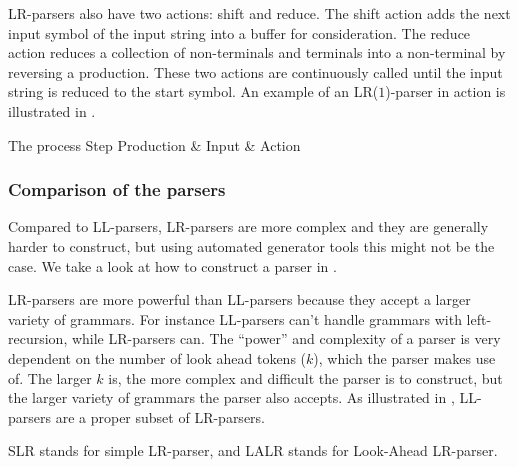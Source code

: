 LR-parsers also have two actions: shift and reduce. The shift action adds the
next input symbol of the input string into a buffer for consideration. The
reduce action reduces a collection of non-terminals and terminals into a
non-terminal by reversing a production. These two actions are continuously
called until the input string is reduced to the start symbol\cite{sebesta2013}.
An example of an LR($1$)-parser in action is illustrated in .

	  {The process	    					 }
{Step  	 }{Production & Input       & Action                     }{
}

\subsubsection{Comparison of the parsers}
Compared to LL-parsers, LR-parsers are more complex and they are generally
harder to construct\cite[p. 193]{sebesta2013}, but using automated generator
tools this might not be the case. We take a look at how to construct a parser in
.

LR-parsers are more powerful than LL-parsers because they accept a larger
variety of grammars. For instance LL-parsers can't handle grammars with
left-recursion, while LR-parsers can. The ``power'' and complexity of a parser
is very dependent on the number of look ahead tokens ($k$), which the parser makes
use of. The larger $k$ is, the more complex and difficult the parser is to
construct, but the larger variety of grammars the parser also accepts. As
illustrated in , LL-parsers are a proper
subset of LR-parsers.


SLR stands for simple LR-parser, and LALR stands for Look-Ahead LR-parser.
